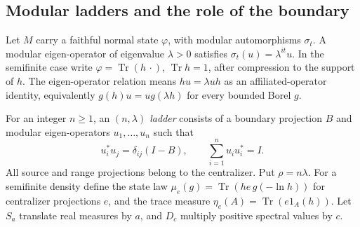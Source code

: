 \subsection{Modular ladders and the role of the boundary}\label{sec:ladders}
Let $M$ carry a faithful normal state $\varphi$, with modular automorphisms $\sigma_t$. A modular eigen-operator of eigenvalue $\lambda>0$ satisfies $\sigma_t(u)=\lambda^{it}u$. In the semifinite case write $\varphi=\operatorname{Tr}(h\,\cdot)$, $\operatorname{Tr}h=1$, after compression to the support of $h$. The eigen-operator relation means $hu=\lambda uh$ as an affiliated-operator identity, equivalently $g(h)u=u g(\lambda h)$ for every bounded Borel $g$.

For an integer $n\ge1$, an \emph{$(n,\lambda)$ ladder} consists of a boundary projection $B$ and modular eigen-operators $u_1,\ldots,u_n$ such that
\begin{equation}\label{eq:ladder-relations}
 u_i^*u_j=\delta_{ij}(I-B),\qquad \sum_{i=1}^n u_i u_i^*=I.
\end{equation}
All source and range projections belong to the centralizer. Put $\rho=n\lambda$. For a semifinite density define the state law $\mu_e(g)=\operatorname{Tr}(he\,g(-\ln h))$ for centralizer projections $e$, and the trace measure $\eta_e(A)=\operatorname{Tr}(e1_A(h))$. Let $S_a$ translate real measures by $a$, and $D_c$ multiply positive spectral values by $c$.

